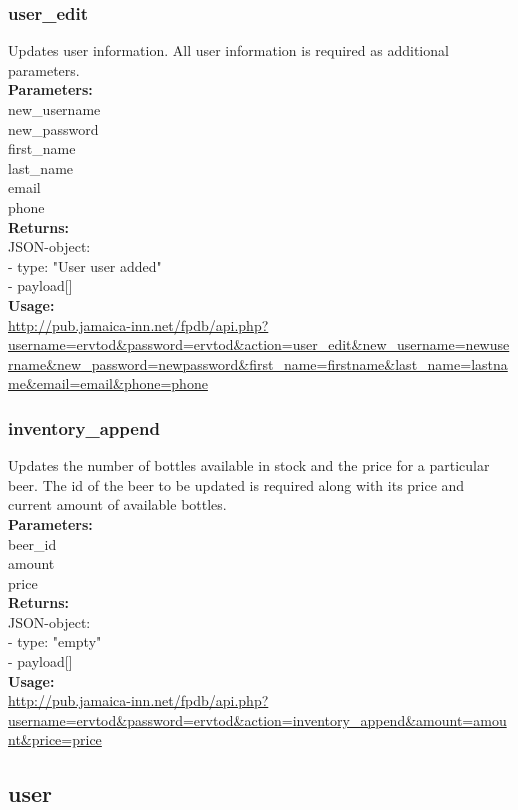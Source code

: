 \documentclass{article}
\begin{document}
\subsubsection{user\_edit}
Updates user information. All user information is required as additional parameters.\\
\textbf{Parameters:}\\
new\_username\\
new\_password\\
first\_name\\
last\_name\\
email\\
phone\\
\textbf{Returns:}\\
JSON-object:\\
- type: "User user added"\\
- payload[]\\
\textbf{Usage:}\\
\url{http://pub.jamaica-inn.net/fpdb/api.php?username=ervtod\&password=ervtod\&action=user\_edit\&new\_username=newusername\&new\_password=newpassword\&first\_name=firstname\&last\_name=lastname\&email=email\&phone=phone}\\
 
\subsubsection{inventory\_append}
Updates the number of bottles available in stock and the price for a particular beer. The id of the beer to be updated is required along with its price and current amount of available bottles.\\
\textbf{Parameters:}\\
beer\_id\\
amount\\
price\\
\textbf{Returns:}\\
JSON-object:\\
- type: "empty"\\
- payload[]\\
\textbf{Usage:}\\
\url{http://pub.jamaica-inn.net/fpdb/api.php?username=ervtod\&password=ervtod\&action=inventory\_append\&amount=amount\&price=price}\\

\subsection{user}
\end{document}
